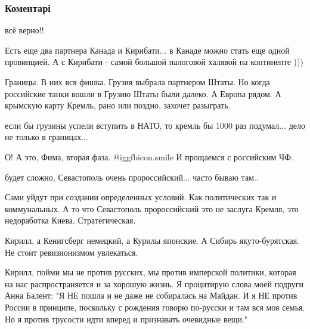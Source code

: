  
 
 
 
 
\subsubsection{Коментарі}

\begin{itemize} %
всё верно!!


Есть еще два партнера Канада и Кирибати... в Канаде можно стать еще одной
провинцией. А с Кирибати - самой большой налоговой халявой на континенте )))



Границы. В них вся фишка. Грузия выбрала партнером Штаты. Но когда российские
танки вошли в Грузию Штаты были далеко. А Европа рядом. А крымскую карту
Кремль, рано или поздно, захочет разыграть.

если бы грузины успели вступить в НАТО, то кремль бы 1000 раз подумал... дело не только в границах...

О! А это, Фима, вторая фаза.  @igg{fbicon.smile} 
И прощаемся с российским ЧФ.

будет сложно, Севастополь очень пророссийский... часто бываю там..


Сами уйдут при создании определенных условий. Как политических так и
коммунальных. А то что Севастополь пророссийский это не заслуга Кремля, это
недоработка Киева. Стратегическая.

Кирилл, а Кенигсберг немецкий, а Курилы японские. А Сибирь якуто-бурятская. Не стоит ревизионизмом увлекаться.


Кирилл, пойми мы не против русских, мы против имперской политики, которая на
нас распространяется и за хорошую жизнь. Я процитирую слова моей подруги Анна
Балент: "Я НЕ пошла и не даже не собиралась на Майдан. И я НЕ против России в
принципе, поскольку с рождения говорю по-русски и там вся моя семья. Но я
против трусости идти вперед и признавать очевидные вещи."


\end{itemize}
